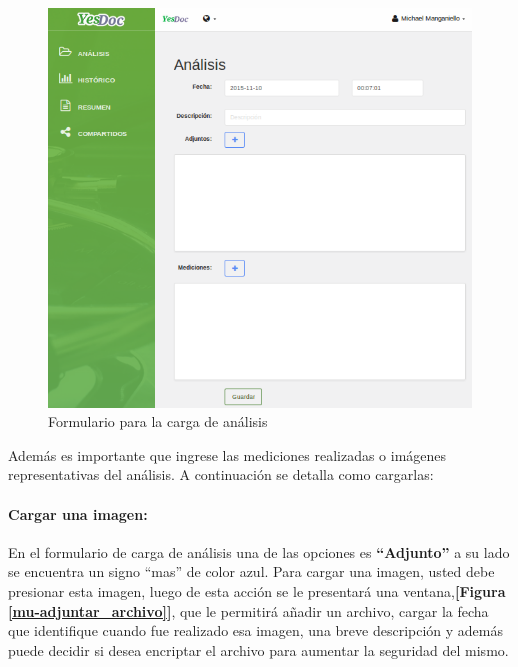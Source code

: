  
 
 \begin{figure}
 	\centering
 	\includegraphics[width=.8\textwidth]{img/manual_de_usuario/mu-cargar_analisis}
 	\caption{Formulario para la carga de análisis}
 	\label{mu-cargar_analisis}
 \end{figure}
 
 Además es importante que ingrese las mediciones realizadas o imágenes representativas del análisis. A continuación se detalla como cargarlas:
 
\paragraph{Cargar una imagen:} 
 	
 	En el formulario de carga de análisis una de las opciones es \textbf{``Adjunto''} a su lado se encuentra  un signo ``mas'' de color azul. Para cargar una imagen, usted debe presionar esta imagen, luego de esta acción se le presentará una ventana,\textbf{[Figura \ref{mu-adjuntar_archivo}]}, que le permitirá añadir un archivo, cargar la fecha que identifique cuando fue realizado esa imagen, una breve descripción y además puede decidir si desea encriptar el archivo para aumentar la seguridad del mismo.
 	
